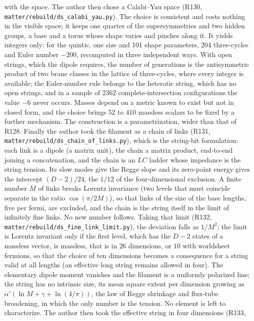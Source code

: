 \documentclass[11pt,a4paper]{article}
\theoremstyle{plain}
\theoremstyle{remark}
\begin{document}
with the space. The author then chose a Calabi--Yau space (R130, \texttt{matter/rebuild/ds\_calabi\_yau.py}). The
choice is consistent and costs nothing in the visible space; it keeps one quarter of the supersymmetries and two
hidden groups, a base and a torus whose shape varies and pinches along it. It yields integers only: for the quintic,
one size and 101 shape parameters, 204 three-cycles and Euler number $-200$, recomputed in three independent ways.
With open strings, which the dipole requires, the number of generations is the antisymmetric product of two brane
classes in the lattice of three-cycles, where every integer is available; the Euler-number rule belongs to the
heterotic string, which has no open strings, and in a sample of 2362 complete-intersection configurations the value
$-6$ never occurs. Masses depend on a metric known to exist but not in closed form, and the choice brings 52 to 410
massless scalars to be fixed by a further mechanism. The construction is a parametrization, wider than that of R128.
Finally the author took the filament as a chain of links (R131, \texttt{matter/rebuild/ds\_chain\_of\_links.py}),
which is the string-bit formulation: each link is a dipole (a matrix unit), the chain a matrix product, end-to-end
joining a concatenation, and the chain is an $LC$ ladder whose impedance is the string tension. Its slow modes give
the Regge slope and its zero-point energy gives the intercept $(D-2)/24$, the $1/12$ of the four-dimensional
exclusion. A finite number $M$ of links breaks Lorentz invariance (two levels that must coincide separate in the
ratio $\cos(\pi/2M)$), so that links of the size of the base lengths, five per fermi, are excluded, and the chain is
the string itself in the limit of infinitely fine links. No new number follows. Taking that limit (R132,
\texttt{matter/rebuild/ds\_fine\_link\_limit.py}), the deviation falls as $1/M^2$; the limit is Lorentz invariant only
if the first level, which has the $D-2$ states of a massless vector, is massless, that is in $26$ dimensions, or $10$
with worldsheet fermions, so that the choice of ten dimensions becomes a consequence for a string valid at all lengths
(an effective long string remains allowed in four). The elementary dipole moment vanishes and the filament is a
uniformly polarized line; the string has no intrinsic size, its mean square extent per dimension growing as
$\alpha'(\ln M+\gamma+\ln(4/\pi))$, the law of Regge shrinkage and flux-tube broadening, in which the only number is
the tension. No element is left to characterize. The author then took the effective string in four dimensions (R133,
\end{document}
